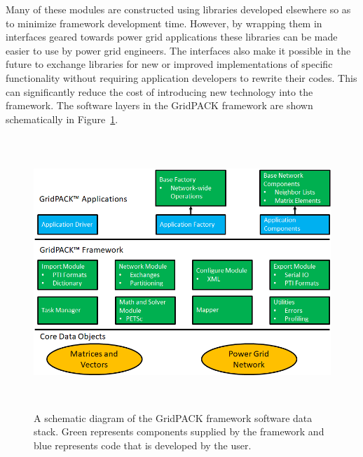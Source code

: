\documentclass[12pt]{report} %
\begin{document}
Many of these modules are constructed using libraries developed elsewhere so as to minimize framework development time. However, by wrapping them in interfaces geared towards power grid applications these libraries can be made easier to use by power grid engineers. The interfaces also make it possible in the future to exchange libraries for new or improved implementations of specific functionality without requiring application developers to rewrite their codes. This can significantly reduce the cost of introducing new technology into the framework. The software layers in the GridPACK framework are shown schematically in  Figure~\ref{fig:fig-2}.

\begin{figure}
  \centering
    \includegraphics*[width=6in, height=4.05in, keepaspectratio=true]{Fig2-Grid-framework-schematic}
  \caption{A schematic diagram of the GridPACK framework software data stack. Green represents components supplied by the framework and blue represents code that is developed by the user.}
  \label{fig:fig-2}
\end{figure}



\end{document}
